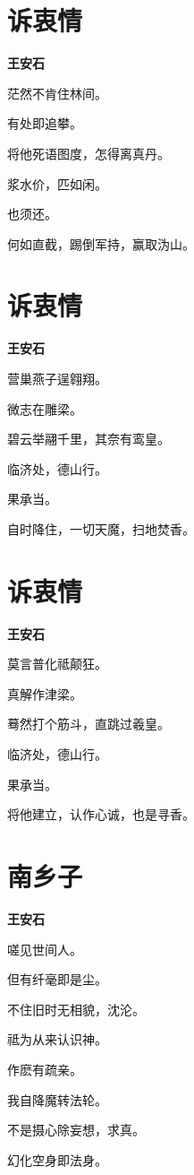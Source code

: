 \documentclass[12pt,a4paper]{ctexbook}
\begin{document}
\section{诉衷情}
\textbf{王安石}\par\vspace{0.5em}
茫然不肯住林间。\par
有处即追攀。\par
将他死语图度，怎得离真丹。\par
浆水价，匹如闲。\par
也须还。\par
何如直截，踢倒军持，赢取沩山。\par

\section{诉衷情}
\textbf{王安石}\par\vspace{0.5em}
营巢燕子逞翱翔。\par
微志在雕梁。\par
碧云举翮千里，其奈有鸾皇。\par
临济处，德山行。\par
果承当。\par
自时降住，一切天魔，扫地焚香。\par

\section{诉衷情}
\textbf{王安石}\par\vspace{0.5em}
莫言普化祗颠狂。\par
真解作津梁。\par
蓦然打个筋斗，直跳过羲皇。\par
临济处，德山行。\par
果承当。\par
将他建立，认作心诚，也是寻香。\par

\section{南乡子}
\textbf{王安石}\par\vspace{0.5em}
嗟见世间人。\par
但有纤毫即是尘。\par
不住旧时无相貌，沈沦。\par
祗为从来认识神。\par
作麽有疏亲。\par
我自降魔转法轮。\par
不是摄心除妄想，求真。\par
幻化空身即法身。\par
\end{document}
